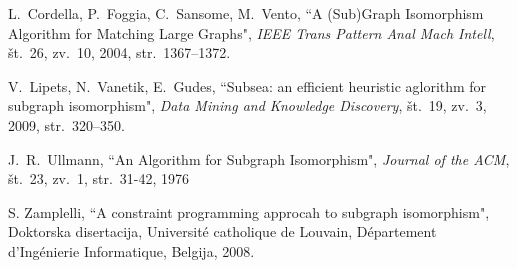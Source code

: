 \documentclass[a4paper, 12pt, ]{book}
\begin{document}
\begin{thebibliography}{99}


	 L.~Cordella, P.~Foggia, C.~Sansome, M.~Vento, ``A (Sub)Graph Isomorphism Algorithm for Matching Large Graphs",
		\textit {IEEE Trans Pattern Anal Mach Intell}, št.~26, zv.~10, 2004, str.~1367--1372.
	
	 V.~Lipets, N.~Vanetik, E.~Gudes, ``Subsea: an efficient heuristic aglorithm for subgraph isomorphism",
		\textit {Data Mining and Knowledge Discovery}, št.~19, zv.~3, 2009, str.~320--350.

	 J.~R.~Ullmann, ``An Algorithm for Subgraph Isomorphism",
		\textit{Journal of the ACM}, št.~23, zv.~1, str.~31-42, 1976

	 S. Zamplelli, ``A constraint programming approcah to subgraph isomorphism", Doktorska disertacija, 
	Universit\'{e} catholique de Louvain, D\'{e}partement d’Ing\'{e}nierie Informatique, Belgija, 2008.

\end{thebibliography}
\end{document}
